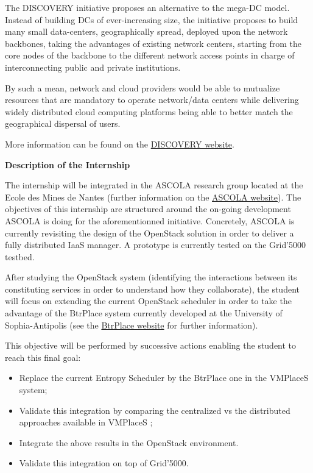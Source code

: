 \documentclass{letter}
\begin{document}
\begin{letter}
The DISCOVERY initiative proposes an alternative to the mega-DC model.
Instead of building DCs of ever-increasing size, the initiative
proposes to build many small data-centers, geographically spread,
deployed upon the network backbones, taking the advantages of existing
network centers, starting from the core nodes of the backbone to the
different network access points in charge of interconnecting public
and private institutions.

By such a mean, network and cloud providers would be able to mutualize resources
that are mandatory to operate network/data centers while delivering widely
distributed cloud computing platforms being able to better match the
geographical dispersal of users.

More information can be found on the
\href{http://beyondtheclouds.github.io}{DISCOVERY website}.


{\Large \textbf{Description of the Internship}}

The internship will be integrated in the ASCOLA research group located
at the Ecole des Mines de Nantes (further information on the
\href{http://www.emn.fr/z-info/ascola/doku.php}{ASCOLA website}).
The objectives of this internship are structured around the on-going
development ASCOLA is doing for the aforementionned initiative.
Concretely, ASCOLA is currently revisiting the design of the OpenStack
solution in order to deliver a fully distributed IaaS manager. A
prototype is currently tested on the Grid'5000 testbed.

After studying the OpenStack system (identifying the interactions between its constituting services in order to
understand how they collaborate), the student will focus on
extending the current OpenStack scheduler in order to take the
advantage of the BtrPlace system currently developed at the
University of Sophia-Antipolis (see the
\href{http://www.btrplace.org}{BtrPlace website} for further
information).

This objective will be performed by successive actions enabling the
student to reach this final goal:
\begin{itemize}
\item Replace the current Entropy Scheduler by the BtrPlace one in the
  VMPlaceS system;
\item Validate this integration by comparing the centralized vs the
  distributed approaches available in VMPlaceS ;
\item Integrate the above results in the OpenStack environment.
\item Validate this integration on top of Grid'5000.
\end{itemize}


\end{letter}
\end{document}
